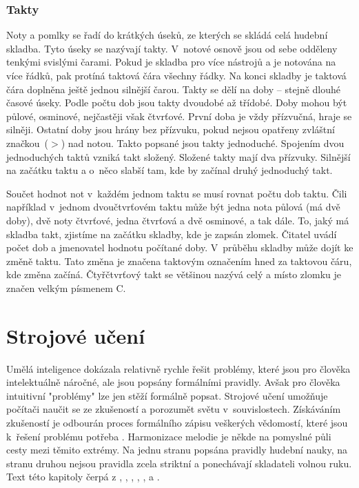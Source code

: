 \subsection{Takty}
Noty a pomlky se řadí do krátkých úseků, 
ze kterých se skládá celá hudební skladba.
Tyto úseky se nazývají takty.
V~notové osnově jsou od sebe odděleny tenkými svislými čarami.
Pokud je skladba pro více nástrojů a je notována na více řádků, 
pak protíná taktová čára všechny řádky.
Na konci skladby je taktová čára doplněna ještě jednou silnější čarou. 
Takty se dělí na doby -- stejně dlouhé časové úseky.
Podle počtu dob jsou takty dvoudobé až třídobé.
Doby mohou být půlové, osminové, nejčastěji však čtvrťové.
První doba je vždy přízvučná, hraje se silněji.
Ostatní doby jsou hrány bez přízvuku, 
pokud nejsou opatřeny zvláštní značkou~($>$) nad notou.
Takto popsané jsou takty jednoduché.
Spojením dvou jednoduchých taktů vzniká takt složený.
Složené takty mají dva přízvuky.
Silnější na začátku taktu a o~něco slabší tam, 
kde by začínal druhý jednoduchý takt.
\par

Součet hodnot not v~každém jednom taktu se musí rovnat počtu dob taktu.
Čili například v~jednom  dvoučtvrťovém taktu 
může být jedna nota půlová (má dvě doby), 
dvě noty čtvrťové, jedna čtvrťová a dvě osminové, a tak dále.
To, jaký má skladba takt, zjistíme na začátku skladby, kde je zapsán zlomek.
Čitatel uvádí počet dob a jmenovatel hodnotu počítané doby.
V~průběhu skladby může dojít ke změně taktu.
Tato změna je značena taktovým označením hned za taktovou čáru, 
kde změna začíná.
Čtyřčtvrťový takt se většinou nazývá celý 
a místo zlomku je značen velkým písmenem C.
\cite{cmiral,zenkl}

\chapter{Strojové učení}
Umělá inteligence dokázala relativně rychle řešit problémy, 
které jsou pro člověka intelektuálně náročné, 
ale jsou popsány formálními pravidly.
Avšak pro člověka intuitivní "problémy" lze jen stěží formálně popsat.
Strojové učení umožňuje počítači naučit se ze zkušeností
a porozumět světu v~souvislostech.
Získáváním zkušeností je odbourán proces formálního zápisu veškerých vědomostí,
které jsou k~řešení problému potřeba
\cite{Goodfellow-et-al-2016}.
Harmonizace melodie je někde na pomyslné půli cesty mezi těmito extrémy.
Na jednu stranu popsána pravidly hudební nauky,
na stranu druhou nejsou pravidla zcela striktní 
a ponechávají skladateli volnou ruku.
Text této kapitoly čerpá z \cite{Goodfellow-et-al-2016}, \cite{Nicholson_NeuralNets}, 
\cite{Chalupnik_NeuronoveSite}, \cite{Mehrotra_ElementsOfNNs}, \cite{Nicholson_NeuralNets}, \cite{Nicholson_Perceptron} a \cite{Kvasnicka_NeuronoveSite}.
\par

